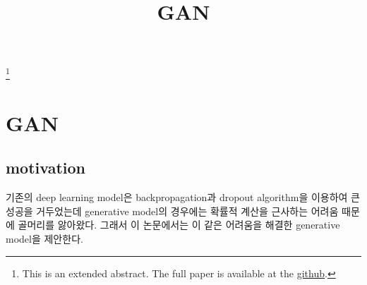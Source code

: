 \documentclass[extendedabs]{bmvc2k}
\begin{document}
\title{GAN}
\maketitle
\let\thefootnote\relax\footnote{This is an extended abstract. The full paper is available at the \href{https://github.com/LeeGwanHui/TIL/tree/main/deeplearning_ham}{github}. }
\vspace{-0.2in}

\section{GAN\cite{goodfellow2014generative}}
 \subsection{motivation}
  \quad 기존의 deep learning model은 backpropagation과 dropout algorithm을 이용하여 큰 성공을 거두었는데 generative model의 경우에는 
  확률적 계산을 근사하는 어려움 때문에 골머리를 앓아왔다. 그래서 이 논문에서는 이 같은 어려움을 해결한 generative model을 제안한다.
\end{document}
